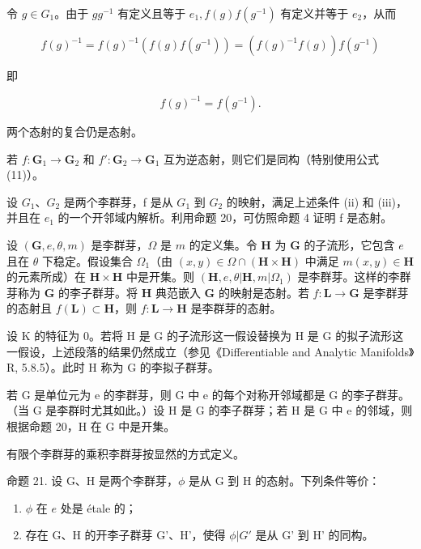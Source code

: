 令 \(g \in G_1\)。由于 \(gg^{-1}\) 有定义且等于 \(e_1, f(g)f(g^{-1})\) 有定义并等于 \(e_2\)，从而

\[
f (g) ^ {- 1} = f (g) ^ {- 1} \left(f (g) f \left(g ^ {- 1}\right)\right) = \left(f (g) ^ {- 1} f (g)\right) f \left(g ^ {- 1}\right)
\]

即

\[
f (g) ^ {- 1} = f (g ^ {- 1}).\tag{11}
\]

两个态射的复合仍是态射。

若 \(f: \mathbf{G}_1 \to \mathbf{G}_2\) 和 \(f': \mathbf{G}_2 \to \mathbf{G}_1\) 互为逆态射，则它们是同构（特别使用公式 (11)）。

设 \(G_{1}\)、\(G_{2}\) 是两个李群芽，f 是从 \(G_{1}\) 到 \(G_{2}\) 的映射，满足上述条件 (ii) 和 (iii)，并且在 \(e_{1}\) 的一个开邻域内解析。利用命题 20，可仿照命题 4 证明 f 是态射。

设 \((\mathbf{G}, e, \theta, m)\) 是李群芽，\(\Omega\) 是 \(m\) 的定义集。令 \(\mathbf{H}\) 为 \(\mathbf{G}\) 的子流形，它包含 \(e\) 且在 \(\theta\) 下稳定。假设集合 \(\Omega_1\)（由 \((x, y) \in \Omega \cap (\mathbf{H} \times \mathbf{H})\) 中满足 \(m(x, y) \in \mathbf{H}\) 的元素所成）在 \(\mathbf{H} \times \mathbf{H}\) 中是开集。则 \((\mathbf{H}, e, \theta | \mathbf{H}, m | \Omega_1)\) 是李群芽。这样的李群芽称为 \(\mathbf{G}\) 的李子群芽。将 \(\mathbf{H}\) 典范嵌入 \(\mathbf{G}\) 的映射是态射。若 \(f: \mathbf{L} \to \mathbf{G}\) 是李群芽的态射且 \(f(\mathbf{L}) \subset \mathbf{H}\)，则 \(f: \mathbf{L} \to \mathbf{H}\) 是李群芽的态射。

设 K 的特征为 0。若将 H 是 G 的子流形这一假设替换为 H 是 G 的拟子流形这一假设，上述段落的结果仍然成立（参见《Differentiable and Analytic Manifolds》R, 5.8.5）。此时 H 称为 G 的李拟子群芽。

若 G 是单位元为 e 的李群芽，则 G 中 e 的每个对称开邻域都是 G 的李子群芽。（当 G 是李群时尤其如此。）设 H 是 G 的李子群芽；若 H 是 G 中 e 的邻域，则根据命题 20，H 在 G 中是开集。

有限个李群芽的乘积李群芽按显然的方式定义。

命题 21. 设 G、H 是两个李群芽，\(\phi\) 是从 G 到 H 的态射。下列条件等价：

\begin{enumerate}
\def\labelenumi{(\roman{enumi})}
\item
  \(\phi\) 在 \(e\) 处是 étale 的；
\item
  存在 G、H 的开李子群芽 G'、H'，使得 \(\phi|G'\) 是从 G' 到 H' 的同构。
\end{enumerate}

